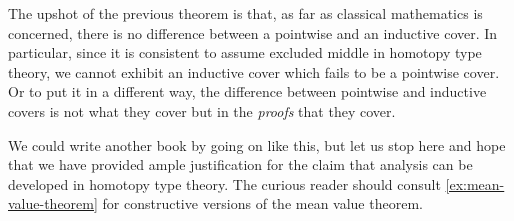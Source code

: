 \documentclass[12pt]{article}
\let\autoref\cref
\begin{document}
The upshot of the previous theorem is that, as far as classical mathematics is concerned,
there is no difference between a pointwise and an inductive cover. In particular, since it
is consistent to assume excluded middle in homotopy type theory, we cannot exhibit an
inductive cover which fails to be a pointwise cover. Or to put it in a different way, the
difference between pointwise and inductive covers is not what they cover but in the
\emph{proofs} that they cover. 

We could write another book by going on like this, but let us stop here and hope that we
have provided ample justification for the claim that analysis can be developed in homotopy
type theory. The curious reader should consult \autoref{ex:mean-value-theorem} for
constructive versions of the mean value theorem.


%
%
\end{document}
